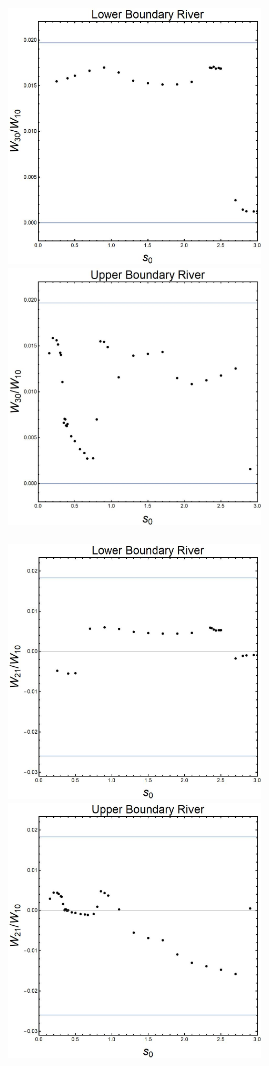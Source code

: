 ﻿\documentclass[12pt,a4paper]{article}
\begin{document}
\begin{figure}[H]
    \centering
   {{\includegraphics[width=6.7cm]{L30.jpg} }}
  {{\includegraphics[width=6.7cm]{U30.jpg} }}
\end{figure}

\begin{figure}[H]
    \centering
   {{\includegraphics[width=6.7cm]{L21.jpg} }}
  {{\includegraphics[width=6.7cm]{U21.jpg} }}
\end{figure}
\end{document}

